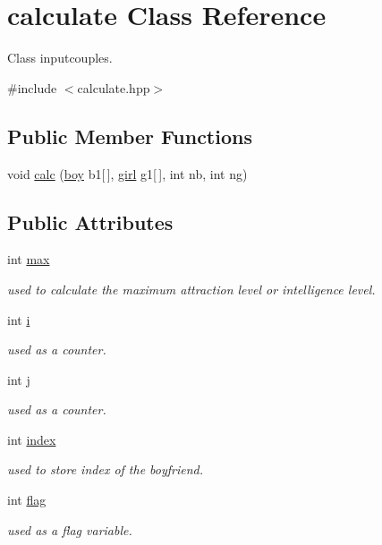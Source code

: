 \hypertarget{classcalculate}{\section{calculate Class Reference}
\label{classcalculate}
}


Class inputcouples.  




{\ttfamily \#include $<$calculate.\-hpp$>$}

\subsection*{Public Member Functions}
\begin{DoxyCompactItemize}
\item 
void \hyperlink{classcalculate_ae4d4a7815c07cd2666f0bf75123451e8}{calc} (\hyperlink{classboy}{boy} b1\mbox{[}$\,$\mbox{]}, \hyperlink{classgirl}{girl} g1\mbox{[}$\,$\mbox{]}, int nb, int ng)
\end{DoxyCompactItemize}
\subsection*{Public Attributes}
\begin{DoxyCompactItemize}
\item 
int \hyperlink{classcalculate_a8d0c1aad864e4dbf7383dfaa5793092b}{max}
\begin{DoxyCompactList}\small\item\em used to calculate the maximum attraction level or intelligence level. \end{DoxyCompactList}\item 
int \hyperlink{classcalculate_a5c9861336ddba84dff43216b3cf12111}{i}
\begin{DoxyCompactList}\small\item\em used as a counter. \end{DoxyCompactList}\item 
int \hyperlink{classcalculate_aba966e9d5f8f31a432200721dfdb0c70}{j}
\begin{DoxyCompactList}\small\item\em used as a counter. \end{DoxyCompactList}\item 
int \hyperlink{classcalculate_a7c2b95b41f956840477c3e8c76ca4ea4}{index}
\begin{DoxyCompactList}\small\item\em used to store index of the boyfriend. \end{DoxyCompactList}\item 
int \hyperlink{classcalculate_a3a8df97169e40361036031d613d59256}{flag}
\begin{DoxyCompactList}\small\item\em used as a flag variable. \end{DoxyCompactList}\end{DoxyCompactItemize}


